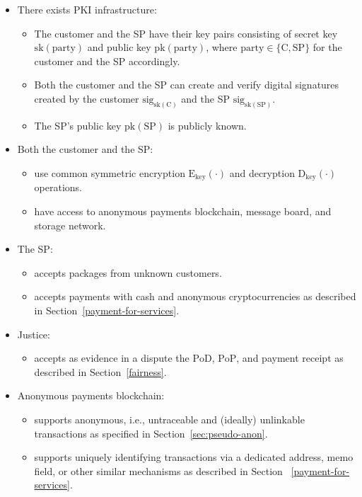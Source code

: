 \documentclass[pdftex,twocolumn,epjc3]{svjour3}
\begin{document}
{\begin{itemize}
\item There exists PKI infrastructure:
    \begin{itemize}
        \item The customer and the SP have their key pairs consisting of secret key $\mathrm{sk}(\mathrm{party})$ and public key $\mathrm{pk}(\mathrm{party})$, where $\mathrm{party} \in \{\mathrm{C}, \mathrm{SP}\}$ for the customer and the SP accordingly.
        \item Both the customer and the SP can create and verify digital signatures created by the customer $\mathrm{sig}_{\mathrm{sk}(\mathrm{C})}$ and the SP $\mathrm{sig}_{\mathrm{sk}(\mathrm{SP})}$.
        \item The SP's public key $\mathrm{pk}(\mathrm{SP})$ is publicly known.
    \end{itemize}
    
\item Both the customer and the SP:
    \begin{itemize}
        \item use common symmetric encryption $\mathrm{E}_\mathrm{key}(\cdot)$ and decryption $\mathrm{D}_\mathrm{key}(\cdot)$ operations.
        \item have access to anonymous payments blockchain, message board, and storage network.
    \end{itemize}

\item The SP:
    \begin{itemize}
        \item accepts packages from unknown customers.
        \item accepts payments with cash and anonymous cryptocurrencies as described in Section~\ref{payment-for-services}.
    \end{itemize}
    
\item Justice:
    \begin{itemize}
        \item accepts as evidence in a dispute the $\mathrm{PoD}$, $\mathrm{PoP}$, and payment $\mathrm{receipt}$ as described in Section~\ref{fairness}.
    \end{itemize}

\item Anonymous payments blockchain:
    \begin{itemize}
        \item supports anonymous, i.e., untraceable and (ideally) unlinkable transactions as specified in Section~\ref{sec:pseudo-anon}.
        \item supports uniquely identifying transactions via a dedicated address, memo field, or other similar mechanisms as described in Section ~\ref{payment-for-services}. 
    \end{itemize}


\end{itemize}}
\end{document}

